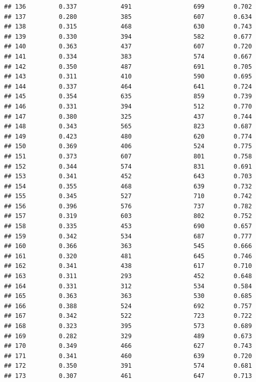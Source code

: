 \documentclass[]{book}
\begin{document}
\begin{verbatim}
## 136         0.337            491                 699        0.702
## 137         0.280            385                 607        0.634
## 138         0.315            468                 630        0.743
## 139         0.330            394                 582        0.677
## 140         0.363            437                 607        0.720
## 141         0.334            383                 574        0.667
## 142         0.350            487                 691        0.705
## 143         0.311            410                 590        0.695
## 144         0.337            464                 641        0.724
## 145         0.354            635                 859        0.739
## 146         0.331            394                 512        0.770
## 147         0.380            325                 437        0.744
## 148         0.343            565                 823        0.687
## 149         0.423            480                 620        0.774
## 150         0.369            406                 524        0.775
## 151         0.373            607                 801        0.758
## 152         0.344            574                 831        0.691
## 153         0.341            452                 643        0.703
## 154         0.355            468                 639        0.732
## 155         0.345            527                 710        0.742
## 156         0.396            576                 737        0.782
## 157         0.319            603                 802        0.752
## 158         0.335            453                 690        0.657
## 159         0.342            534                 687        0.777
## 160         0.366            363                 545        0.666
## 161         0.320            481                 645        0.746
## 162         0.341            438                 617        0.710
## 163         0.311            293                 452        0.648
## 164         0.331            312                 534        0.584
## 165         0.363            363                 530        0.685
## 166         0.388            524                 692        0.757
## 167         0.342            522                 723        0.722
## 168         0.323            395                 573        0.689
## 169         0.282            329                 489        0.673
## 170         0.349            466                 627        0.743
## 171         0.341            460                 639        0.720
## 172         0.350            391                 574        0.681
## 173         0.307            461                 647        0.713

\end{verbatim}
\end{document}
